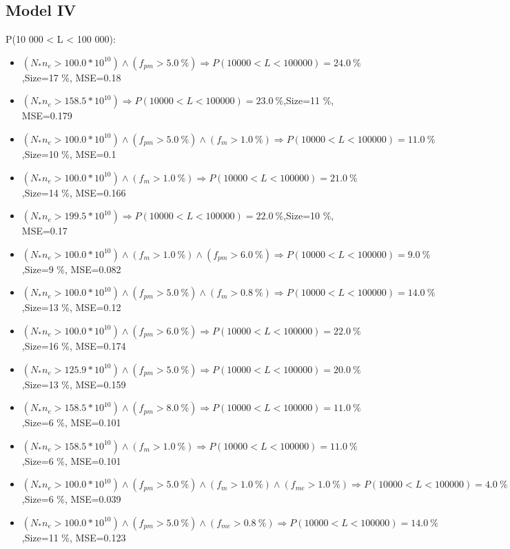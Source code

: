 \documentclass[numbered]{CSL}
\begin{document}
\subsection{Model IV}
P(10 000 < L < 100 000):
\begin{itemize}
\item $(N_* n_e > 100.0 * 10^{10}) \land (f_{pm} > 5.0~\%) \Rightarrow P(10 000 < L < 100 000) = 24.0~\%$,\hfill Size=17 \%, MSE=0.18
\item $(N_* n_e > 158.5 * 10^{10}) \Rightarrow P(10 000 < L < 100 000) = 23.0~\%$,\hfill Size=11 \%, MSE=0.179
\item $(N_* n_e > 100.0 * 10^{10}) \land (f_{pm} > 5.0~\%) \land (f_m > 1.0~\%) \Rightarrow P(10 000 < L < 100 000) = 11.0~\%$,\hfill Size=10 \%, MSE=0.1
\item $(N_* n_e > 100.0 * 10^{10}) \land (f_m > 1.0~\%) \Rightarrow P(10 000 < L < 100 000) = 21.0~\%$,\hfill Size=14 \%, MSE=0.166
\item $(N_* n_e > 199.5 * 10^{10}) \Rightarrow P(10 000 < L < 100 000) = 22.0~\%$,\hfill Size=10 \%, MSE=0.17
\item $(N_* n_e > 100.0 * 10^{10}) \land (f_m > 1.0~\%) \land (f_{pm} > 6.0~\%) \Rightarrow P(10 000 < L < 100 000) = 9.0~\%$,\hfill Size=9 \%, MSE=0.082
\item $(N_* n_e > 100.0 * 10^{10}) \land (f_{pm} > 5.0~\%) \land (f_m > 0.8~\%) \Rightarrow P(10 000 < L < 100 000) = 14.0~\%$,\hfill Size=13 \%, MSE=0.12
\item $(N_* n_e > 100.0 * 10^{10}) \land (f_{pm} > 6.0~\%) \Rightarrow P(10 000 < L < 100 000) = 22.0~\%$,\hfill Size=16 \%, MSE=0.174
\item $(N_* n_e > 125.9 * 10^{10}) \land (f_{pm} > 5.0~\%) \Rightarrow P(10 000 < L < 100 000) = 20.0~\%$,\hfill Size=13 \%, MSE=0.159
\item $(N_* n_e > 158.5 * 10^{10}) \land (f_{pm} > 8.0~\%) \Rightarrow P(10 000 < L < 100 000) = 11.0~\%$,\hfill Size=6 \%, MSE=0.101
\item $(N_* n_e > 158.5 * 10^{10}) \land (f_m > 1.0~\%) \Rightarrow P(10 000 < L < 100 000) = 11.0~\%$,\hfill Size=6 \%, MSE=0.101
\item $(N_* n_e > 100.0 * 10^{10}) \land (f_{pm} > 5.0~\%) \land (f_m > 1.0~\%) \land (f_{me} > 1.0~\%) \Rightarrow P(10 000 < L < 100 000) = 4.0~\%$,\hfill Size=6 \%, MSE=0.039
\item $(N_* n_e > 100.0 * 10^{10}) \land (f_{pm} > 5.0~\%) \land (f_{me} > 0.8~\%) \Rightarrow P(10 000 < L < 100 000) = 14.0~\%$,\hfill Size=11 \%, MSE=0.123

\end{itemize}
\end{document}
